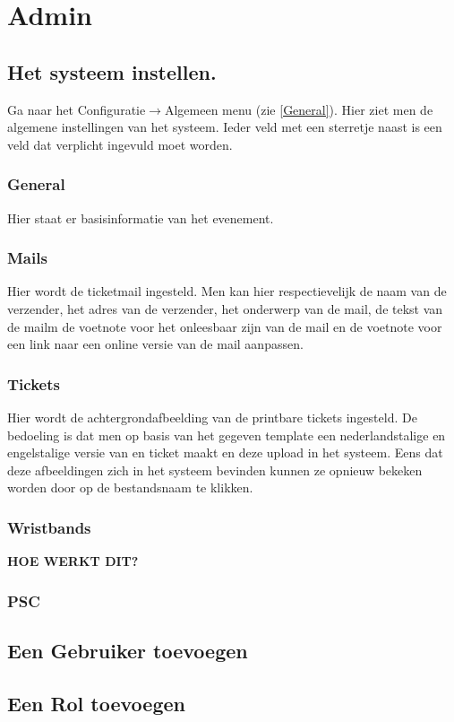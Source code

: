\documentclass[]{memoir}
\begin{document}
\section{Admin} \label{AdminInstr}
\subsection{Het systeem instellen.} \label{SetSystem}
Ga naar het Configuratie$\rightarrow$Algemeen menu (zie \ref{General}). Hier ziet men de algemene instellingen van het systeem. Ieder veld met een sterretje naast is een veld dat verplicht ingevuld moet worden.
\subsubsection{General}
Hier staat er basisinformatie van het evenement.
\subsubsection{Mails}
Hier wordt de ticketmail ingesteld. Men kan hier respectievelijk de naam van de verzender, het adres van de verzender, het onderwerp van de mail, de tekst van de mailm de voetnote voor het onleesbaar zijn van de mail en de voetnote voor een link naar een online versie van de mail aanpassen.
\subsubsection{Tickets}
Hier wordt de achtergrondafbeelding van de printbare tickets ingesteld. De bedoeling is dat men op basis van het gegeven template een nederlandstalige en engelstalige versie van en ticket maakt en deze upload in het systeem. Eens dat deze afbeeldingen zich in het systeem bevinden kunnen ze opnieuw bekeken worden door op de bestandsnaam te klikken.
\subsubsection{Wristbands}
\textbf{HOE WERKT DIT?}
\subsubsection{PSC}
\subsection{Een Gebruiker toevoegen} \label{AddUser}
\subsection{Een Rol toevoegen} \label{SetRole}
\end{document}
